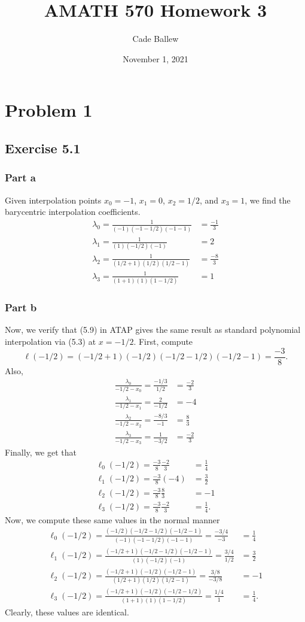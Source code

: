 \documentclass{article}
\title{AMATH 570 Homework 3}
\author{Cade Ballew}
\date{November 1, 2021}
\begin{document}
\maketitle

\section{Problem 1}
\subsection{Exercise 5.1}
\subsubsection{Part a}
Given interpolation points $x_0=-1$, $x_1=0$, $x_2=1/2$, and $x_3=1$, we find the barycentric interpolation coefficients.
\begin{align*}
\lambda_0=\frac{1}{(-1)(-1-1/2)(-1-1)}&=\frac{-1}{3}\\
\lambda_1=\frac{1}{(1)(-1/2)(-1)}&=2\\
\lambda_2=\frac{1}{(1/2+1)(1/2)(1/2-1)}&=\frac{-8}{3}\\
\lambda_3=\frac{1}{(1+1)(1)(1-1/2)}&=1
\end{align*}
\subsubsection{Part b}
Now, we verify that (5.9) in ATAP gives the same result as standard polynomial interpolation via (5.3) at $x=-1/2$. First, compute
\[
\ell(-1/2)=(-1/2+1)(-1/2)(-1/2-1/2)(-1/2-1)=\frac{-3}{8}.
\]
Also,
\begin{align*}
\frac{\lambda_0}{-1/2-x_0}=\frac{-1/3}{1/2}&=\frac{-2}{3}\\
\frac{\lambda_1}{-1/2-x_1}=\frac{2}{-1/2}&=-4\\
\frac{\lambda_2}{-1/2-x_2}=\frac{-8/3}{-1}&=\frac{8}{3}\\
\frac{\lambda_3}{-1/2-x_3}=\frac{1}{-3/2}&=\frac{-2}{3}
\end{align*}
Finally, we get that 
\begin{align*}
\ell_0(-1/2)=\frac{-3}{8}\frac{-2}{3}&=\frac{1}{4}\\
\ell_1(-1/2)=\frac{-3}{8}(-4)&=\frac{3}{2}\\
\ell_2(-1/2)=\frac{-3}{8}\frac{8}{3}&=-1\\
\ell_3(-1/2)=\frac{-3}{8}\frac{-2}{3}&=\frac{1}{4}.
\end{align*}
Now, we compute these same values in the normal manner
\begin{align*}
\ell_0(-1/2)=\frac{(-1/2)(-1/2-1/2)(-1/2-1)}{(-1)(-1-1/2)(-1-1)}=\frac{-3/4}{-3}&=\frac{1}{4}\\
\ell_1(-1/2)=\frac{(-1/2+1)(-1/2-1/2)(-1/2-1)}{(1)(-1/2)(-1)}=\frac{3/4}{1/2}&=\frac{3}{2}\\
\ell_2(-1/2)=\frac{(-1/2+1)(-1/2)(-1/2-1)}{(1/2+1)(1/2)(1/2-1)}=\frac{3/8}{-3/8}&=-1\\
\ell_3(-1/2)=\frac{(-1/2+1)(-1/2)(-1/2-1/2)}{(1+1)(1)(1-1/2)}=\frac{1/4}{1}&=\frac{1}{4}.
\end{align*}
Clearly, these values are identical.
\end{document}
